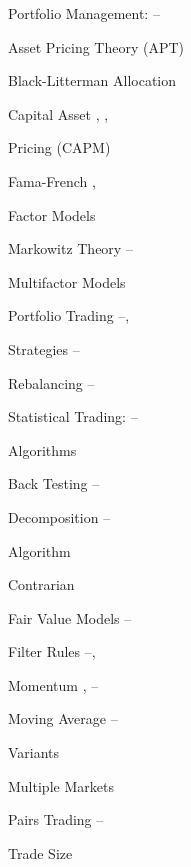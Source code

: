 \begin{multicols}{2}
\noindent Portfolio Management: \hfill \pageref{in:portman1}--\pageref{in:portman2} \par
\twoindent Asset Pricing Theory (APT) \hfill \pageref{in:apt} \par
\twoindent Black-Litterman Allocation \hfill \pageref{in:allo} \par 
\twoindent Capital Asset \hfill \pageref{in:capm1}, \pageref{in:capm2}, \pageref{in:capm3} \par
\hspace{0.75cm} Pricing (CAPM) \par 
\twoindent Fama-French \hfill \pageref{in:fama1}, \pageref{in:fama2} \par \hspace{0.75cm} Factor Models \par 
\twoindent Markowitz Theory \hfill \pageref{in:mark1}--\pageref{in:mark2} \par
\twoindent Multifactor Models \hfill \pageref{in:mfm1} \par %
\twoindent Portfolio Trading \hfill \pageref{in:ports1}--\pageref{in:ports2}, \par \hspace{0.75cm} Strategies \hfill \pageref{in:ports3}--\pageref{in:ports4} \par
\twoindent Rebalancing \hfill \pageref{in:rebalance1}--\pageref{in:rebalance2} \par
\vspace{\baselineskip}


\noindent Statistical Trading: \hfill \pageref{in:sta1}--\pageref{in:sta2} \par \hspace{0.75cm} Algorithms \par
\twoindent Back Testing \hfill \pageref{in:back1}--\pageref{in:back2} \par
\twoindent Decomposition \hfill \pageref{in:decomp1}--\pageref{in:decomp2} \par \hspace{0.75cm} Algorithm \par 
\twoindent Contrarian \hfill \pageref{in:contrary} \par
\twoindent Fair Value Models \hfill \pageref{in:fvm1}--\pageref{in:fvm2} \par
\twoindent Filter Rules \hfill \pageref{in:filter1}--\pageref{in:filter2}, \pageref{in:filter3} \par
\twoindent Momentum \hfill \pageref{in:mom1}, \pageref{in:mom2}--\pageref{in:mom3} \par
\twoindent Moving Average \hfill \pageref{in:mva1}--\pageref{in:mva2} \par \hspace{0.75cm} Variants \par 
\twoindent Multiple Markets \hfill \pageref{in:multmark} \par
\twoindent Pairs Trading \hfill \pageref{in:pairs1}--\pageref{in:pairs2} \par
\twoindent Trade Size \hfill \pageref{in:tradesize} \par
\vspace{\baselineskip}



\end{multicols}
